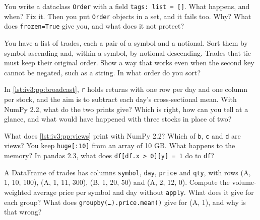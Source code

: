 \begin{question}\label{iq:iv3:python-and-pandas:15}
You write a dataclass \texttt{Order} with a field \texttt{tags: list = []}. What happens, and when? Fix it. Then you put \texttt{Order} objects in a set, and it fails too. Why? What does \texttt{frozen=True} give you, and what does it not protect?
\end{question}

\begin{question}\label{iq:iv3:python-and-pandas:16}
You have a list of trades, each a pair of a symbol and a notional. Sort them by symbol ascending and, within a symbol, by notional descending. Trades that tie must keep their original order. Show a way that works even when the second key cannot be negated, such as a string. In what order do you sort?
\end{question}

\begin{question}\label{iq:iv3:python-and-pandas:17}
In \cref{lst:iv3:pp:broadcast}, \texttt{r} holds returns with one row per day and one column per stock, and the aim is to subtract each day's cross-sectional mean. With NumPy 2.2, what do the two prints give? Which is right, how can you tell at a glance, and what would have happened with three stocks in place of two?
\label{lst:iv3:pp:broadcast}
\end{question}

\begin{question}\label{iq:iv3:python-and-pandas:18}
What does \cref{lst:iv3:pp:views} print with NumPy 2.2? Which of \texttt{b}, \texttt{c} and \texttt{d} are views? You keep \texttt{huge[:10]} from an array of 10 GB. What happens to the memory? In pandas 2.3, what does \texttt{df[df.x > 0][\textquotesingle y\textquotesingle] = 1} do to \texttt{df}?
\label{lst:iv3:pp:views}
\end{question}

\begin{question}\label{iq:iv3:python-and-pandas:19}
A DataFrame of trades has columns \texttt{symbol}, \texttt{day}, \texttt{price} and \texttt{qty}, with rows (A, 1, 10, 100), (A, 1, 11, 300), (B, 1, 20, 50) and (A, 2, 12, 0). Compute the volume-weighted average price per symbol and day without \texttt{apply}. What does it give for each group? What does \texttt{groupby(\dots).price.mean()} give for (A, 1), and why is that wrong?
\end{question}

